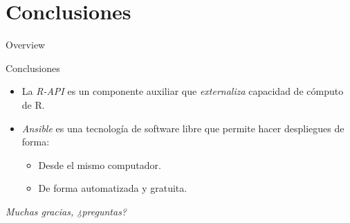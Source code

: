 \documentclass[12pt, aspectratio=169]{beamer} %
\begin{document}
\section{Conclusiones}

\begin{frame}{Overview}
\tableofcontents
\end{frame}

\begin{frame}{Conclusiones}
  \begin{itemize}
  \item La \textit{R-API} es un componente auxiliar que \textit{externaliza} capacidad de cómputo de R.
  \item \textit{Ansible} es una tecnología de software libre que permite hacer despliegues de forma:
    \begin{itemize}
    \item Desde el mismo computador.
    \item De forma automatizada y gratuita.
    \end{itemize}

  \end{itemize}
\end{frame}

\begin{frame}{}
  \centering \Large
  \emph{Muchas gracias, ¿preguntas?}
\end{frame}
\end{document}
